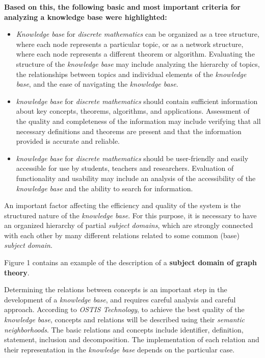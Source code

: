 \documentclass[twocolumn]{scndocument}
\begin{document}
\textbf{Based on this, the following basic and most important criteria for analyzing a knowledge base were
highlighted:}
\begin{itemize}[noitemsep]
    \item \textit{Knowledge base} for \textit{discrete mathematics} can be organized as a tree structure, where each node represents a particular topic, or as a network structure, where each node represents a different theorem or algorithm. Evaluating the structure of the \textit{knowledge base} may include analyzing the hierarchy of topics, the relationships between topics and individual elements of the \textit{knowledge base}, and the ease of navigating the \textit{knowledge base}.
    \item \textit{knowledge base} for \textit{discrete mathematics} should contain sufficient information about key concepts, theorems, algorithms, and applications. Assessment of the quality and completeness of the information may include verifying that all necessary definitions and theorems are present and that the information provided is accurate and reliable.
    \item \textit{knowledge base} for \textit{discrete mathematics} should be user-friendly and easily accessible for use by students, teachers and researchers. Evaluation of functionality and usability may include an analysis of the accessibility of the \textit{knowledge base} and the ability to search for information.
\end{itemize}

An important factor affecting the efficiency and quality of the system is the structured nature of the \textit{knowledge base}. For this purpose, it is necessary to have an organized hierarchy of partial \textit{subject domains}, which are strongly connected with each other by many different relations related to some common (base) \textit{subject domain}.

Figure 1 contains an example of the description of a \textbf{subject domain of graph theory}.

Determining the relations between concepts is an important step in the development of a \textit{knowledge base}, and requires careful analysis and careful approach. According to \textit{OSTIS Technology}, to achieve the best quality of the \textit{knowledge base}, concepts and relations will be described using their \textit{semantic neighborhoods}. The basic relations and concepts include identifier, definition, statement, inclusion and decomposition. The implementation of each relation and their representation in the \textit{knowledge base} depends on the particular case.
\end{document}
